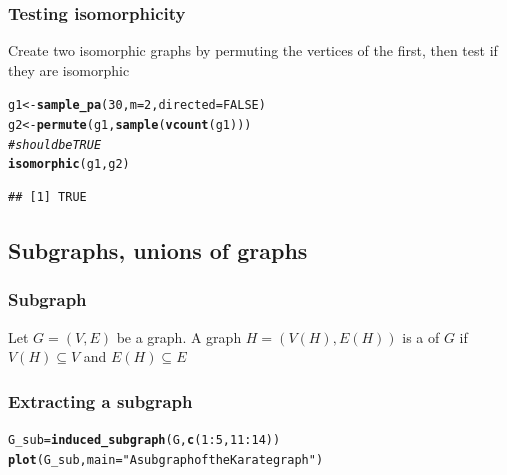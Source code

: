 \documentclass[aspectratio=169]{beamer}\usepackage[]{graphicx}\usepackage[]{xcolor}
\makeatletter
\newcommand{\hlnum}[1]{\textcolor[rgb]{0.686,0.059,0.569}{#1}}%
\newcommand{\hlsng}[1]{\textcolor[rgb]{0.192,0.494,0.8}{#1}}%
\newcommand{\hlcom}[1]{\textcolor[rgb]{0.678,0.584,0.686}{\textit{#1}}}%
\newcommand{\hlopt}[1]{\textcolor[rgb]{0,0,0}{#1}}%
\newcommand{\hldef}[1]{\textcolor[rgb]{0.345,0.345,0.345}{#1}}%
\newcommand{\hlkwb}[1]{\textcolor[rgb]{0.69,0.353,0.396}{#1}}%
\newcommand{\hlkwc}[1]{\textcolor[rgb]{0.333,0.667,0.333}{#1}}%
\newcommand{\hlkwd}[1]{\textcolor[rgb]{0.737,0.353,0.396}{\textbf{#1}}}%
\newenvironment{kframe}{%
 \def\at@end@of@kframe{}%
 \ifinner\ifhmode%
  \def\at@end@of@kframe{\end{minipage}}%
  \begin{minipage}{\columnwidth}%
 \fi\fi%
 \def\FrameCommand##1{\hskip\@totalleftmargin \hskip-\fboxsep
 \colorbox{shadecolor}{##1}\hskip-\fboxsep
     \hskip-\linewidth \hskip-\@totalleftmargin \hskip\columnwidth}%
 \MakeFramed {\advance\hsize-\width
   \@totalleftmargin\z@ \linewidth\hsize
   \@setminipage}}%
 {\par\unskip\endMakeFramed%
 \at@end@of@kframe}
\newenvironment{knitrout}{}{} %
\makeatother
\begin{document}
\begin{frame}[fragile]\frametitle{Testing isomorphicity}
Create two isomorphic graphs by permuting the vertices of the first, then test if they are isomorphic
\vfill
\begin{knitrout}
\color{fgcolor}\begin{kframe}
\begin{alltt}
\hldef{g1} \hlkwb{<-} \hlkwd{sample_pa}\hldef{(}\hlnum{30}\hldef{,} \hlkwc{m} \hldef{=} \hlnum{2}\hldef{,} \hlkwc{directed} \hldef{=} \hlnum{FALSE}\hldef{)}
\hldef{g2} \hlkwb{<-} \hlkwd{permute}\hldef{(g1,} \hlkwd{sample}\hldef{(}\hlkwd{vcount}\hldef{(g1)))}
\hlcom{# should be TRUE}
\hlkwd{isomorphic}\hldef{(g1, g2)}
\end{alltt}
\begin{verbatim}
## [1] TRUE
\end{verbatim}
\end{kframe}
\end{knitrout}
\end{frame}


\subsection{Subgraphs, unions of graphs}

\begin{frame}\frametitle{Subgraph}
\begin{definition}[Subgraph]
Let $G=(V,E)$ be a graph.
A graph $H=(V(H),E(H))$ is a  of $G$ if $V(H)\subseteq V$ and $E(H)\subseteq E$
\end{definition}
\end{frame}

\begin{frame}[fragile]\frametitle{Extracting a subgraph}
\begin{knitrout}
\color{fgcolor}\begin{kframe}
\begin{alltt}
\hldef{G_sub} \hlkwb{=} \hlkwd{induced_subgraph}\hldef{(G,} \hlkwd{c}\hldef{(}\hlnum{1}\hlopt{:}\hlnum{5}\hldef{,} \hlnum{11}\hlopt{:}\hlnum{14}\hldef{))}
\hlkwd{plot}\hldef{(G_sub,} \hlkwc{main} \hldef{=} \hlsng{"A subgraph of the Karate graph"}\hldef{)}
\end{alltt}
\end{kframe}
\end{knitrout}
\end{frame}
\end{document}
